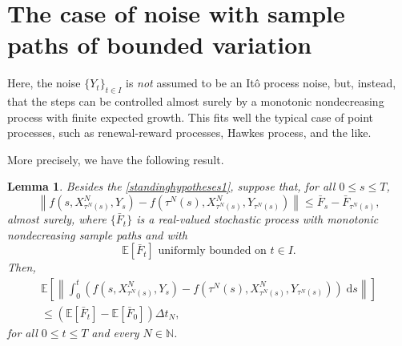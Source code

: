 \documentclass[reqno,12pt]{amsart}
\theoremstyle{plain} %
\newtheorem{lemma}{Lemma}[section]
\theoremstyle{definition} %
\begin{document}
\section{The case of noise with sample paths of bounded variation}
\label{secmonotonicbound}

Here, the noise $\{Y_t\}_{t\in I}$ is \emph{not} assumed to be an It\^o process noise, but, instead, that the steps can be controlled almost surely by a monotonic nondecreasing process with finite expected growth. This fits well the typical case of point processes, such as renewal-reward processes, Hawkes process, and the like.

More precisely, we have the following result.
\begin{lemma}
    \label{lemmonotonicbound}
    Besides the \cref{standinghypotheses1}, suppose that, for all $0 \leq s \leq T$,
    \begin{equation}
        \label{stepbound}
          \left\|f(s, X_{\tau^N(s)}^N, Y_s) - f({\tau^N(s)}, X_{\tau^N(s)}^N, Y_{\tau^N(s)})\right\| \leq \bar F_s - \bar F_{\tau^N(s)},
      \end{equation}
      almost surely, where $\{\bar F_t\}$ is a real-valued stochastic process with monotonic nondecreasing sample paths and with
      \begin{equation}
        \label{expectstepmonotonic}
        \mathbb{E}[\bar F_t] \textrm{ uniformly bounded on } t\in I.
      \end{equation}
      Then,
      \begin{multline}
        \label{expectintfboundbyG}
          \mathbb{E}\left[\left\|\int_0^t \left( f(s, X_{\tau^N(s)}^N, Y_s) - f(\tau^N(s), X_{\tau^N(s)}^N, Y_{\tau^N(s)}) \right)\;\mathrm{d}s\right\|\right] \\
          \leq (\mathbb{E}[\bar F_t] - \mathbb{E}[\bar F_0])\Delta t_N,
      \end{multline}
      for all $0 \leq t \leq T$ and every $N\in \mathbb{N}$.
\end{lemma}
\end{document}
